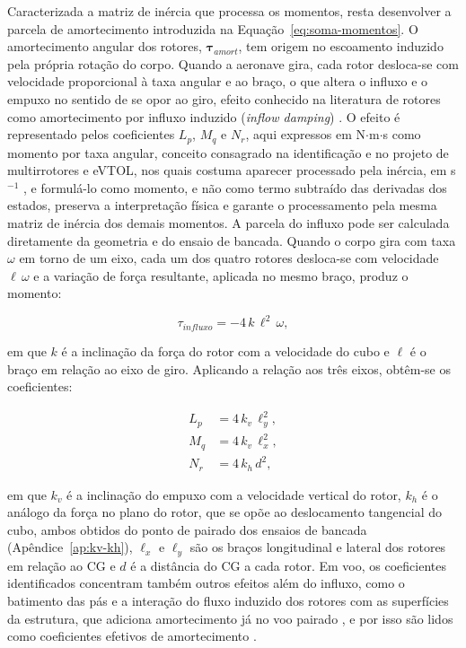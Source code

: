 {\color{blue}Caracterizada a matriz de inércia que processa os momentos, resta desenvolver a parcela de amortecimento introduzida na Equação~\eqref{eq:soma-momentos}. O amortecimento angular dos rotores, $\boldsymbol{\tau}_{amort}$, tem origem no escoamento induzido pela própria rotação do corpo. Quando a aeronave gira, cada rotor desloca-se com velocidade proporcional à taxa angular e ao braço, o que altera o influxo e o empuxo no sentido de se opor ao giro, efeito conhecido na literatura de rotores como amortecimento por influxo induzido (\textit{inflow damping}) \cite{Nguyen2025}. O efeito é representado pelos coeficientes $L_p$, $M_q$ e $N_r$, aqui expressos em N$\cdot$m$\cdot$s como momento por taxa angular, conceito consagrado na identificação e no projeto de multirrotores e eVTOL, nos quais costuma aparecer processado pela inércia, em s$^{-1}$ \cite{Ivler2019, Malpica2024, Nguyen2025}, e formulá-lo como momento, e não como termo subtraído das derivadas dos estados, preserva a interpretação física e garante o processamento pela mesma matriz de inércia dos demais momentos. A parcela do influxo pode ser calculada diretamente da geometria e do ensaio de bancada. Quando o corpo gira com taxa $\omega$ em torno de um eixo, cada um dos quatro rotores desloca-se com velocidade $\ell\,\omega$ e a variação de força resultante, aplicada no mesmo braço, produz o momento:

\begin{equation}
  \tau_{influxo} = -4\,k\,\ell^{2}\,\omega,
  \label{eq:amort-priori}
\end{equation}

em que $k$ é a inclinação da força do rotor com a velocidade do cubo e $\ell$ é o braço em relação ao eixo de giro. Aplicando a relação aos três eixos, obtêm-se os coeficientes:

\begin{align}
  L_p &= 4\,k_v\,\ell_y^{2}, \label{eq:priori-lp} \\
  M_q &= 4\,k_v\,\ell_x^{2}, \label{eq:priori-mq} \\
  N_r &= 4\,k_h\,d^{2},     \label{eq:priori-nr}
\end{align}

em que $k_v$ é a inclinação do empuxo com a velocidade vertical do rotor, $k_h$ é o análogo da força no plano do rotor, que se opõe ao deslocamento tangencial do cubo, ambos obtidos do ponto de pairado dos ensaios de bancada (Apêndice~\ref{ap:kv-kh}), $\ell_x$ e $\ell_y$ são os braços longitudinal e lateral dos rotores em relação ao CG e $d$ é a distância do CG a cada rotor. Em voo, os coeficientes identificados concentram também outros efeitos além do influxo, como o batimento das pás e a interação do fluxo induzido dos rotores com as superfícies da estrutura, que adiciona amortecimento já no voo pairado \cite{Reddinger2024}, e por isso são lidos como coeficientes efetivos de amortecimento \cite{Nguyen2025}.}

